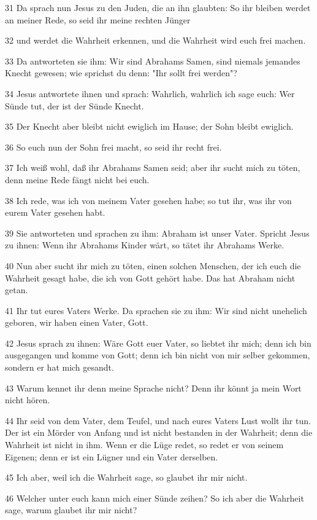 \par 31 Da sprach nun Jesus zu den Juden, die an ihn glaubten: So ihr bleiben werdet an meiner Rede, so seid ihr meine rechten Jünger
\par 32 und werdet die Wahrheit erkennen, und die Wahrheit wird euch frei machen.
\par 33 Da antworteten sie ihm: Wir sind Abrahams Samen, sind niemals jemandes Knecht gewesen; wie sprichst du denn: "Ihr sollt frei werden"?
\par 34 Jesus antwortete ihnen und sprach: Wahrlich, wahrlich ich sage euch: Wer Sünde tut, der ist der Sünde Knecht.
\par 35 Der Knecht aber bleibt nicht ewiglich im Hause; der Sohn bleibt ewiglich.
\par 36 So euch nun der Sohn frei macht, so seid ihr recht frei.
\par 37 Ich weiß wohl, daß ihr Abrahams Samen seid; aber ihr sucht mich zu töten, denn meine Rede fängt nicht bei euch.
\par 38 Ich rede, was ich von meinem Vater gesehen habe; so tut ihr, was ihr von eurem Vater gesehen habt.
\par 39 Sie antworteten und sprachen zu ihm: Abraham ist unser Vater. Spricht Jesus zu ihnen: Wenn ihr Abrahams Kinder wärt, so tätet ihr Abrahams Werke.
\par 40 Nun aber sucht ihr mich zu töten, einen solchen Menschen, der ich euch die Wahrheit gesagt habe, die ich von Gott gehört habe. Das hat Abraham nicht getan.
\par 41 Ihr tut eures Vaters Werke. Da sprachen sie zu ihm: Wir sind nicht unehelich geboren, wir haben einen Vater, Gott.
\par 42 Jesus sprach zu ihnen: Wäre Gott euer Vater, so liebtet ihr mich; denn ich bin ausgegangen und komme von Gott; denn ich bin nicht von mir selber gekommen, sondern er hat mich gesandt.
\par 43 Warum kennet ihr denn meine Sprache nicht? Denn ihr könnt ja mein Wort nicht hören.
\par 44 Ihr seid von dem Vater, dem Teufel, und nach eures Vaters Lust wollt ihr tun. Der ist ein Mörder von Anfang und ist nicht bestanden in der Wahrheit; denn die Wahrheit ist nicht in ihm. Wenn er die Lüge redet, so redet er von seinem Eigenen; denn er ist ein Lügner und ein Vater derselben.
\par 45 Ich aber, weil ich die Wahrheit sage, so glaubet ihr mir nicht.
\par 46 Welcher unter euch kann mich einer Sünde zeihen? So ich aber die Wahrheit sage, warum glaubet ihr mir nicht?
